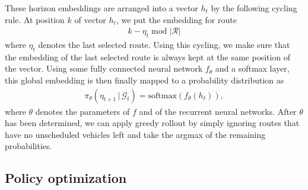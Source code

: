 \documentclass[a4paper]{report}
\theoremstyle{definition}
\theoremstyle{plain}
\begin{document}
These horizon embeddings are arranged into a vector $h_{t}$ by the following
cycling rule. At position $k$ of vector $h_{t}$, we put the embedding for route
\begin{align*}
  k - \eta_{t} \; \mathrm{mod} \; |\mathcal{R}|
\end{align*}
where $\eta_{t}$ denotes the last selected route. Using this cycling, we make sure
that the embedding of the last selected route is always kept at the same
position of the vector.
%
Using some fully connected neural network $f_{\theta}$ and a softmax layer, this
global embedding is then finally mapped to a probability distribution as
\begin{align*}
  \pi_{\theta}(\eta_{t+1} \, | \, \mathcal{G}_{t}) = \text{softmax} ( f_{\theta}(h_{t})) ,
\end{align*}
where $\theta$ denotes the parameters of $f$ and of the recurrent neural
networks.
After $\theta$ has been determined, we can apply greedy rollout by simply
ignoring routes that have no unscheduled vehicles left and take the argmax of
the remaining probabilities.




\clearpage

\subsection{Policy optimization}
\end{document}
